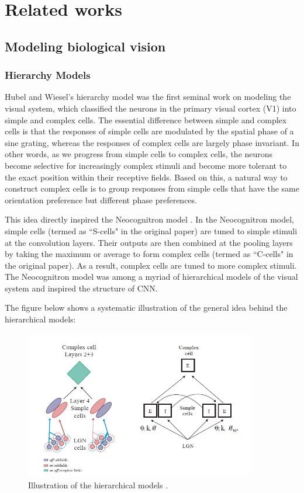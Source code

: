 \chapter{Related works} 
\label{chapter-neuro} 
\section{Modeling biological vision}

\subsection{Hierarchy Models}
\par Hubel and Wiesel's hierarchy model \cite{hubel_receptive_1962} was the first seminal work on modeling the visual system, which classified the neurons in the primary visual cortex (V1) into simple and complex cells. The essential difference between simple and complex cells is that the responses of simple cells are modulated by the spatial phase of a sine grating, whereas the responses of complex cells are largely phase invariant. In other words, as we progress from simple cells to complex cells, the neurons become selective for increasingly complex stimuli and become more tolerant to the exact position within their receptive fields. Based on this, a natural way to construct complex cells is to group responses from simple cells that have the same orientation preference but different phase preferences.

\par This idea directly inspired the Neocognitron model \cite{fukushima_neocognitron_1980}. In the Neocognitron model, simple cells (termed as ``S-cells" in the original paper) are tuned to simple stimuli at the convolution layers. Their outputs are then combined at the pooling layers by taking the maximum or average to form complex cells (termed as ``C-cells" in the original paper). As a result, complex cells are tuned to more complex stimuli. The Neocognitron model was among a myriad of hierarchical models of the visual system and inspired the structure of CNN.

\par The figure below shows a systematic illustration of the general idea behind the hierarchical models:
\begin{figure}[H]
\centering
    \includegraphics[width=10cm]{figures/models/hierarchical-models.png}
     \caption{Illustration of the hierarchical models \cite{martinez_complex_2003}.}
\end{figure}


